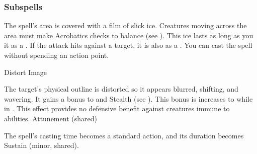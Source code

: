 \subsubsection{Subspells}
The spell's area is covered with a film of slick ice.
Creatures moving across the area must make Acrobatics checks to balance (see ).
This ice lasts as long as you  it as a .
If the attack hits against a target, it is also  as a .
You can cast the spell without spending an action point.
\begin{spellsection}{Distort Image}
\begin{spellcontent}
\begin{spelltargetinginfo}
\end{spelltargetinginfo}
\begin{spelleffects}
\spelleffect
The target's physical outline is distorted so it appears blurred, shifting, and wavering.
It gains a  bonus to  and Stealth (see ).
This bonus is increases to  while in .
This effect provides no defensive benefit against creatures immune to  abilities.
\spelldur Attunement (shared)
\end{spelleffects}
\end{spellcontent}
\begin{spellfooter}
\end{spellfooter}
\begin{spellsubcontent}
\begin{spellcantrip}
The spell's casting time becomes a standard action, and its duration becomes Sustain (minor, shared).
\end{spellcantrip}
\end{spellsubcontent}
\end{spellsection}
